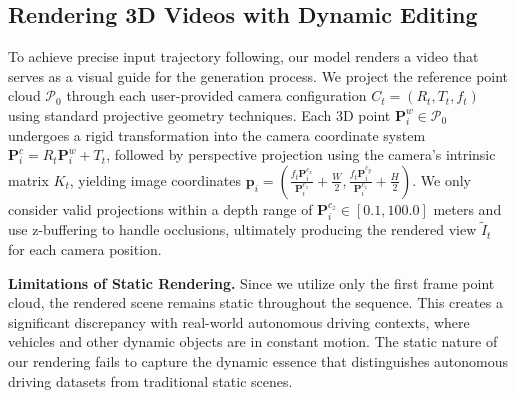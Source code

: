 \documentclass{article}
\newcommand{\TODO}[1]{\textcolor{blue}{TODO: #1}}
\begin{document}
\subsection{Rendering 3D Videos with Dynamic Editing} 
\label{sec:projection}
To achieve precise input trajectory following, our model renders a video that serves as a visual guide for the generation process. We project the reference point cloud $\mathcal{P}_0$ through each user-provided camera configuration $C_t = (R_t, T_t, f_t)$ using standard projective geometry techniques. Each 3D point $\mathbf{P}_i^w \in \mathcal{P}_0$ undergoes a rigid transformation into the camera coordinate system
$\mathbf{P}_i^c = R_t \mathbf{P}_i^w + T_t$,
followed by perspective projection using the camera's intrinsic matrix $K_t$,
yielding image coordinates $\mathbf{p}_i = \left( \frac{f_t \mathbf{P}_i^{c_x}}{\mathbf{P}_i^{c_z}} + \frac{W}{2}, \frac{f_t \mathbf{P}_i^{c_y}}{\mathbf{P}_i^{c_z}} + \frac{H}{2} \right).$
We only consider valid projections within a depth range of $\mathbf{P}_i^{c_z} \in [0.1, 100.0]$ meters and use z-buffering to handle occlusions, ultimately producing the rendered view $\tilde{I}_t$ for each camera position.

\textbf{Limitations of Static Rendering.} 
Since we utilize only the first frame point cloud, the rendered scene remains static throughout the sequence. This creates a significant discrepancy with real-world autonomous driving contexts, where vehicles and other dynamic objects are in constant motion. The static nature of our rendering fails to capture the dynamic essence that distinguishes autonomous driving datasets from traditional static scenes.
\end{document}
